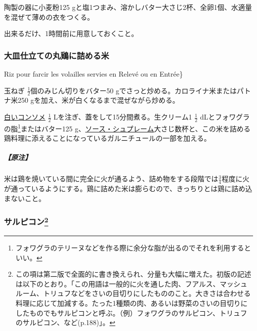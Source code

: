 \begin{recette}
陶製の器に小麦粉125
gと塩1つまみ、溶かしバター大さじ2杯、全卵1個、水適量を混ぜて薄めの衣をつくる。

出来るだけ、1時間前に用意しておくこと。

\atoaki{}

\hypertarget{riz-pour-farcir-les-volailles-servies-en-releve-ou-en-entree}{%
\subsubsection{大皿仕立ての丸鶏に詰める米}\label{riz-pour-farcir-les-volailles-servies-en-releve-ou-en-entree}}

\begin{frsubenv}

\end{frsubenv}

Riz pour farcir les volailles servies en Relevé ou en Entrée\}


玉ねぎ \(\frac{1}{2}\)個のみじん切りをバター50
gでさっと炒める。カロライナ米またはパトナ米250
gを加え、米が白くなるまで混ぜながら炒める。

\protect\hyperlink{consomme-blanc}{白いコンソメ} \(\frac{1}{2}\)
Lを注ぎ、蓋をして15分間煮る。生クリーム1 \(\frac{1}{2}\)
dLとフォワグラの脂\footnote{フォワグラのテリーヌなどを作る際に余分な脂が出るのでそれを利用するといい。}またはバター125
g、\protect\hyperlink{sauce-supreme}{ソース・シュプレーム}大さじ数杯と、この米を詰める鶏料理に添えることになっているガルニチュールの一部を加える。

\hypertarget{nota-riz-pour-farcir-les-volailles-servies-en-releve-ou-en-entree}{%
\subparagraph{【原注】}\label{nota-riz-pour-farcir-les-volailles-servies-en-releve-ou-en-entree}}

米は鶏を焼いている間に完全に火が通るよう、詰め物をする段階では\(\frac{3}{4}\)程度に火が通っているようにする。鶏に詰めた米は膨らむので、きっちりとは鶏に詰め込まないこと。

\atoaki{}

\hypertarget{salpicons-divers}{%
\subsubsection[サルピコン]{\texorpdfstring{サルピコン\footnote{この項は第二版で全面的に書き換えられ、分量も大幅に増えた。初版の記述は以下のとおり。「この用語は一般的に火を通した肉、フアルス、マッシュルーム、トリュフなどをさいの目切りにしたもののこと。大きさは合わせる料理に応じて加減する。たった1種類の肉、あるいは野菜のさいの目切りにしたものでもサルピコンと呼ぶ。（例）フォワグラのサルピコン、トリュフのサルピコン、など(p.188)」。}}{サルピコン}}\label{salpicons-divers}}


\end{recette}
